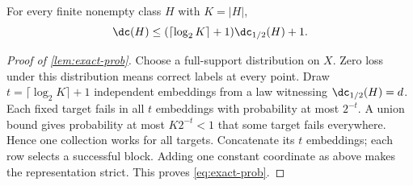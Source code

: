 \begin{lemma}\label{lem:exact-prob}
For every finite nonempty class $H$ with $K=|H|$,
\begin{equation}\label{eq:exact-prob}
 \dc(H)\le(\lceil\log_2K\rceil+1)\dc_{1/2}(H)+1.
\end{equation}
\end{lemma}

\begin{proof}[Proof of \cref{lem:exact-prob}]
Choose a full-support distribution on $X$. Zero loss under this distribution means correct labels at every point. Draw $t=\lceil\log_2K\rceil+1$ independent embeddings from a law witnessing $\dc_{1/2}(H)=d$. Each fixed target fails in all $t$ embeddings with probability at most $2^{-t}$. A union bound gives probability at most $K2^{-t}<1$ that some target fails everywhere. Hence one collection works for all targets. Concatenate its $t$ embeddings; each row selects a successful block. Adding one constant coordinate as above makes the representation strict. This proves \eqref{eq:exact-prob}. 
\end{proof}
